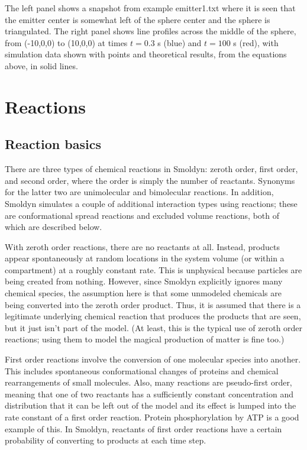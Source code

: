 \documentclass {book}
\begin{document}
The left panel shows a snapshot from example emitter1.txt where it is seen that the emitter center is somewhat left of the sphere center and the sphere is triangulated. The right panel shows line profiles across the middle of the sphere, from (-10,0,0) to (10,0,0) at times $t = 0.3$ s (blue) and $t = 100$ s (red), with simulation data shown with points and theoretical results, from the equations above, in solid lines.


\chapter{Reactions}

\section{Reaction basics}

There are three types of chemical reactions in Smoldyn: zeroth order, first order, and second order, where the order is simply the number of reactants. Synonyms for the latter two are unimolecular and bimolecular reactions. In addition, Smoldyn simulates a couple of additional interaction types using reactions; these are conformational spread reactions and excluded volume reactions, both of which are described below.

With zeroth order reactions, there are no reactants at all. Instead, products appear spontaneously at random locations in the system volume (or within a compartment) at a roughly constant rate. This is unphysical because particles are being created from nothing. However, since Smoldyn explicitly ignores many chemical species, the assumption here is that some unmodeled chemicals are being converted into the zeroth order product. Thus, it is assumed that there is a legitimate underlying chemical reaction that produces the products that are seen, but it just isn't part of the model. (At least, this is the typical use of zeroth order reactions; using them to model the magical production of matter is fine too.)

First order reactions involve the conversion of one molecular species into another. This includes spontaneous conformational changes of proteins and chemical rearrangements of small molecules. Also, many reactions are pseudo-first order, meaning that one of two reactants has a sufficiently constant concentration and distribution that it can be left out of the model and its effect is lumped into the rate constant of a first order reaction. Protein phosphorylation by ATP is a good example of this. In Smoldyn, reactants of first order reactions have a certain probability of converting to products at each time step.
\end{document}

